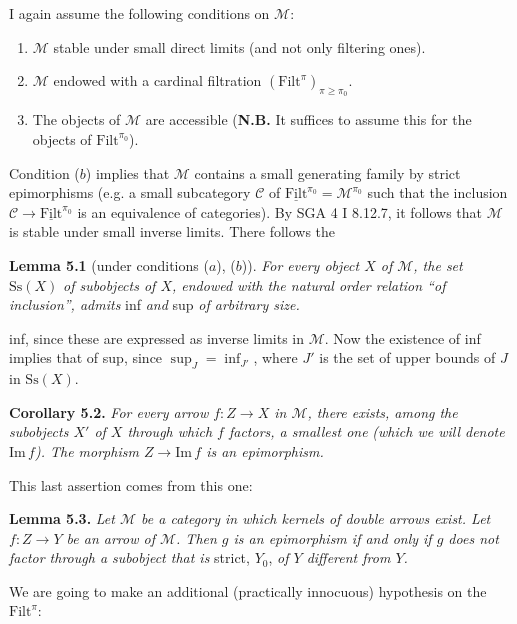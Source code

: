 \documentclass[11pt]{article}
\newcommand{\printedpage}[1]{\marginpar{\footnotesize p.~#1}}
\newcommand{\msp}[1]{\marginpar{\footnotesize [#1]}}
\newcommand{\cM}{\mathcal{M}}
\newcommand{\cC}{\mathcal{C}}
\newcommand{\Filt}{\mathrm{Filt}}
\newcommand{\uFilt}{\underline{\mathrm{Filt}}}
\newcommand{\Ss}{\mathrm{Ss}}
\newcommand{\Img}{\mathrm{Im}\,}
\begin{document}
\printedpage{29}

I again assume the following conditions on $\cM$:
\msp{page 44}

\begin{enumerate}[nosep]
\item[\textit{a})] $\cM$ stable under small direct limits (and not only filtering ones).
\item[\textit{b})] $\cM$ endowed with a cardinal filtration $(\Filt^{\pi})_{\pi\geq\pi_0}$.
\item[\textit{c})] The objects of $\cM$ are accessible (\textbf{N.B.} It suffices to assume this for the objects of $\Filt^{\pi_0}$).
\end{enumerate}

Condition ($b$) implies that $\cM$ contains a small generating family by strict epimorphisms (e.g. a small subcategory $\cC$ of $\uFilt^{\pi_0} = \cM^{\pi_0}$ such that the inclusion $\cC \longrightarrow \uFilt^{\pi_0}$ is an equivalence of categories). By SGA 4 I 8.12.7, it follows that $\cM$ is stable under small inverse limits. There follows the

\textbf{Lemma 5.1} (under conditions ($a$), ($b$)). \textit{For every object $X$ of $\cM$, the set} $\Ss(X)$ \textit{of subobjects of $X$, endowed with the natural order relation ``of inclusion'', admits} inf \textit{and} sup \textit{of arbitrary size.}

inf, since these are expressed as inverse limits in $\cM$. Now the existence of inf implies that of sup, since $\sup_J = \inf_{J'}$, where $J'$ is the set of upper bounds of $J$ in $\Ss(X)$.

\textbf{Corollary 5.2.} \textit{For every arrow $f : Z \longrightarrow X$ in $\cM$, there exists, among the subobjects $X'$ of $X$ through which $f$ factors, a smallest one} %
\msp{page 45}
\textit{(which we will denote} $\Img f$\textit{). The morphism $Z \longrightarrow \Img f$ is an epimorphism.}

This last assertion comes from this one:

\textbf{Lemma 5.3.} \textit{Let $\cM$ be a category in which kernels of double arrows exist. Let $f : Z \longrightarrow Y$ be an arrow of $\cM$. Then $g$ is an epimorphism if and only if $g$ does not factor through a subobject that is} strict, $Y_0$, \textit{of $Y$ different from $Y$.} %

We are going to make an additional (practically innocuous) hypothesis on the $\Filt^{\pi}$:
\end{document}
